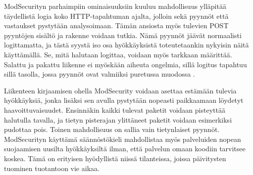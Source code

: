 ModSecurityn parhaimpiin ominaisuuksiin kuuluu mahdollisuus ylläpitää täydellistä logia koko HTTP-tapahtuman ajalta, jolloin sekä pyynnöt että vastaukset pystytään analysoimaan.
Tämän ansiosta myös tulevien POST pyyntöjen sisältö ja rakenne voidaan tutkia. Nämä pyynnöt jäävät normaalisti logittamatta, ja tästä syystä iso osa hyökkäyksistä toteutetaankin 
nykyisin näitä käyttämällä. Se, mitä halutaan logittaa, voidaan myös tarkkaan määrittää. Salattu ja pakattu liikenne ei myöskään aiheuta ongelmia, sillä logitus tapahtuu sillä tasolla,
jossa pyynnöt ovat valmiiksi puretussa muodossa \cite{Mod}.

Liikenteen kirjaamisen ohella ModSecurity voidaan asettaa estämään tulevia hyökkäyksiä, jonka lisäksi sen avulla pystytään nopeasti paikkaamaan löydetyt haavoittuvaisuudet. 
Ensinnäkin kaikki tulevat paketit voidaan pisteyttää halutulla tavalla, ja tietyn pisterajan ylittäneet paketit voidaan esimerkiksi pudottaa pois. Toinen mahdollisuus on sallia vain 
tietynlaiset pyynnöt. ModSecurityn käyttämä säännöstökieli mahdollistaa myös palveluiden nopean suojaamisen uusilta hyökkäyksiltä ilman, että palvelun omaan koodiin tarvitsee koskea.
Tämä on erityisen hyödyllistä niissä tilanteissa, joissa päivitysten tuominen tuotantoon vie aikaa. 
